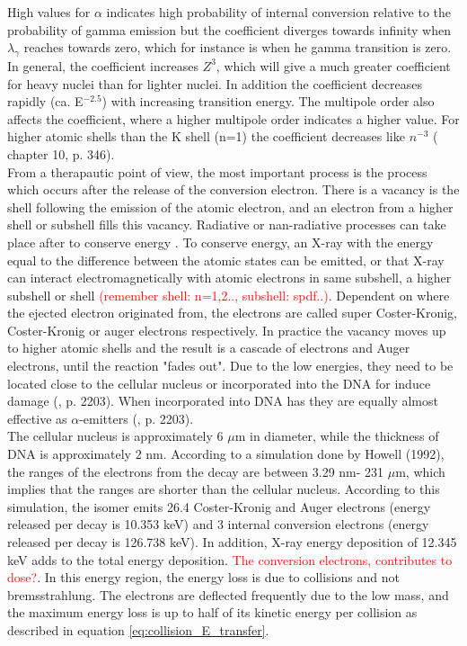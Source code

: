 High values for $\alpha$ indicates high probability of internal conversion relative to the probability of gamma emission but the coefficient diverges towards infinity when $\lambda_\gamma$ reaches towards zero, which for instance is when he gamma transition is zero. In general, the coefficient increases $Z^3$, which will give a much greater coefficient for heavy nuclei than for lighter nuclei. In addition the coefficient decreases rapidly (ca. E$^{-2.5}$) with increasing transition energy. The multipole order also affects the coefficient, where a higher multipole order indicates a higher value. For higher atomic shells than the K shell (n=1) the coefficient decreases like $n^{-3}$ (\cite{KraneKennethS.Halliday1987} chapter 10, p. 346). \\

\noindent 
From a therapautic point of view, the most important process is the process which occurs after the release of the conversion electron. There is a vacancy is the shell following the emission of the atomic electron, and an electron from a higher shell or subshell fills  this vacancy. Radiative or nan-radiative processes can take place after to conserve energy \cite{Howell1992}. To conserve energy, an X-ray with the energy equal to the difference between the atomic states can be emitted, or that X-ray can interact electromagnetically with atomic electrons in same subshell, a higher subshell or shell \textcolor{red}{(remember shell: n=1,2.., subshell: spdf..)}. Dependent on where the ejected electron originated from, the electrons are called super Coster-Kronig, Coster-Kronig or auger electrons respectively. In practice the vacancy moves up to higher atomic shells and the result is a cascade of electrons and Auger electrons, until the reaction "fades out". Due to the low energies, they need to be located close to the cellular nucleus or incorporated into the DNA for induce damage (\cite{Vertes2011a}, p. 2203). When incorporated into DNA has they are equally almost effective as $\alpha$-emitters \cite{Howell1991} (\cite{Vertes2011a}, p. 2203). \\

The cellular nucleus is approximately 6 $\mu$m in diameter, while the thickness of DNA is approximately 2 nm. According to a simulation done by Howell (1992)\cite{Howell1992}, the ranges of the electrons from the decay are between 3.29 nm- 231 $\mu$m, which implies that the ranges are shorter than the cellular nucleus. According to this simulation, the isomer emits 26.4 Coster-Kronig and Auger electrons (energy released per decay is 10.353 keV) and 3 internal conversion electrons (energy released per decay is 126.738 keV). In addition, X-ray energy deposition of 12.345 keV  adds to the total energy deposition.  \textcolor{red}{The conversion electrons, contributes to dose?}. In this energy region, the energy loss is due to collisions and not bremsstrahlung. The electrons are deflected frequently due to the low mass, and the maximum energy loss is up to half of its kinetic energy per collision as described in equation \ref{eq:collision_E_transfer}. \\

